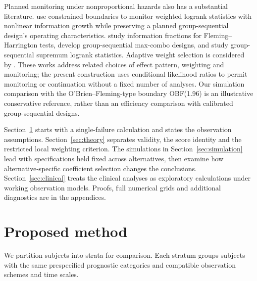 \documentclass[12pt]{article}
\theoremstyle{definition}
\theoremstyle{remark}
\begin{document}
Planned monitoring under nonproportional hazards also has a substantial literature. \citet{BrummelGillen2014} use constrained boundaries to monitor weighted logrank statistics with nonlinear information growth while preserving a planned group-sequential design's operating characteristics. \citet{KunduSarkar2021} study information fractions for Fleming--Harrington tests, \citet{WangLuoZheng2021} develop group-sequential max-combo designs, and \citet{BoherEtAl2024} study group-sequential supremum logrank statistics. Adaptive weight selection is considered by \citet{LiWang2026}. These works address related choices of effect pattern, weighting and monitoring; the present construction uses conditional likelihood ratios to permit monitoring or continuation without a fixed number of analyses. Our simulation comparison with the O'Brien--Fleming-type boundary OBF(1.96) is an illustrative conservative reference, rather than an efficiency comparison with calibrated group-sequential designs.

Section~\ref{sec:methods} starts with a single-failure calculation and states the observation assumptions. Section~\ref{sec:theory} separates validity, the score identity and the restricted local weighting criterion. The simulations in Section~\ref{sec:simulation} lead with specifications held fixed across alternatives, then examine how alternative-specific coefficient selection changes the conclusions. Section~\ref{sec:clinical} treats the clinical analyses as exploratory calculations under working observation models. Proofs, full numerical grids and additional diagnostics are in the appendices.

\section{Proposed method}
\label{sec:methods}

We partition subjects into strata for comparison. Each stratum groups subjects with the same prespecified prognostic categories and compatible observation schemes and time scales.
\end{document}

